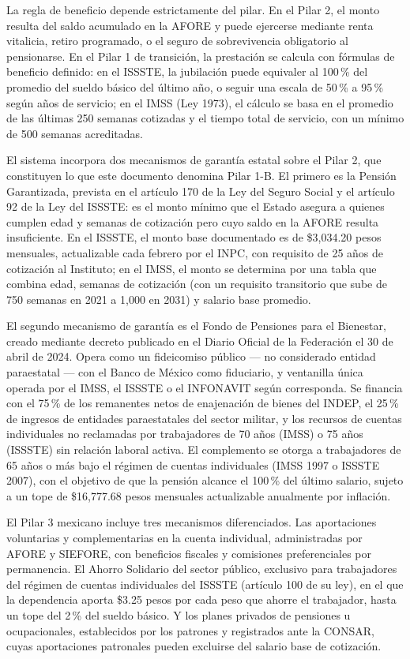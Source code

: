 \documentclass[12pt, letterpaper]{article}
\begin{document}
La regla de beneficio depende estrictamente del pilar. En el Pilar 2, el monto resulta del saldo acumulado en la AFORE y puede ejercerse mediante renta vitalicia, retiro programado, o el seguro de sobrevivencia obligatorio al pensionarse. En el Pilar 1 de transición, la prestación se calcula con fórmulas de beneficio definido: en el ISSSTE, la jubilación puede equivaler al 100\,\% del promedio del sueldo básico del último año, o seguir una escala de 50\,\% a 95\,\% según años de servicio; en el IMSS (Ley 1973), el cálculo se basa en el promedio de las últimas 250 semanas cotizadas y el tiempo total de servicio, con un mínimo de 500 semanas acreditadas.

El sistema incorpora dos mecanismos de garantía estatal sobre el Pilar 2, que constituyen lo que este documento denomina Pilar 1-B. El primero es la Pensión Garantizada, prevista en el artículo 170 de la Ley del Seguro Social y el artículo 92 de la Ley del ISSSTE: es el monto mínimo que el Estado asegura a quienes cumplen edad y semanas de cotización pero cuyo saldo en la AFORE resulta insuficiente. En el ISSSTE, el monto base documentado es de \$3,034.20 pesos mensuales, actualizable cada febrero por el INPC, con requisito de 25 años de cotización al Instituto; en el IMSS, el monto se determina por una tabla que combina edad, semanas de cotización (con un requisito transitorio que sube de 750 semanas en 2021 a 1,000 en 2031) y salario base promedio.

El segundo mecanismo de garantía es el Fondo de Pensiones para el Bienestar, creado mediante decreto publicado en el Diario Oficial de la Federación el 30 de abril de 2024. Opera como un fideicomiso público --- no considerado entidad paraestatal --- con el Banco de México como fiduciario, y ventanilla única operada por el IMSS, el ISSSTE o el INFONAVIT según corresponda. Se financia con el 75\,\% de los remanentes netos de enajenación de bienes del INDEP, el 25\,\% de ingresos de entidades paraestatales del sector militar, y los recursos de cuentas individuales no reclamadas por trabajadores de 70 años (IMSS) o 75 años (ISSSTE) sin relación laboral activa. El complemento se otorga a trabajadores de 65 años o más bajo el régimen de cuentas individuales (IMSS 1997 o ISSSTE 2007), con el objetivo de que la pensión alcance el 100\,\% del último salario, sujeto a un tope de \$16,777.68 pesos mensuales actualizable anualmente por inflación.

El Pilar 3 mexicano incluye tres mecanismos diferenciados. Las aportaciones voluntarias y complementarias en la cuenta individual, administradas por AFORE y SIEFORE, con beneficios fiscales y comisiones preferenciales por permanencia. El Ahorro Solidario del sector público, exclusivo para trabajadores del régimen de cuentas individuales del ISSSTE (artículo 100 de su ley), en el que la dependencia aporta \$3.25 pesos por cada peso que ahorre el trabajador, hasta un tope del 2\,\% del sueldo básico. Y los planes privados de pensiones u ocupacionales, establecidos por los patrones y registrados ante la CONSAR, cuyas aportaciones patronales pueden excluirse del salario base de cotización.
\end{document}
